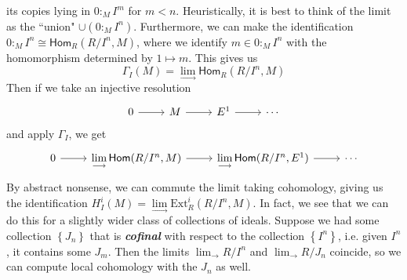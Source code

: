\documentclass[psamsfonts, 12pt]{amsart}
\theoremstyle{definition}
\theoremstyle{remark}
\renewcommand{\hom}{\mathsf{Hom}}
\newcommand{\ib}[1]{\textbf{\textit{#1}}}
\newcommand{\set}[1]{\left\lbrace #1 \right\rbrace}
\begin{document}
its copies lying in $0 :_M I^m$ for $m < n$. Heuristically, it is best to think
of the limit as the ``union" $\cup (0 :_M I^n)$. Furthermore, we can make
the identification $0 :_M I^n \cong \hom_R(R/I^n, M)$, where we identify
$m \in 0:_M I^n$ with the homomorphism determined by $1 \mapsto m$. This gives us
\[
\Gamma_I(M) = \lim_{\longrightarrow}\hom_R(R/I^n,M)
\]
Then if we take an injective resolution
\[\begin{tikzcd}
0 \ar[r] & M \ar[r] & E^1 \ar[r] & \cdots
\end{tikzcd}\]
and apply $\Gamma_I$, we get
\[\begin{tikzcd}
0 \ar[r] & \lim\limits_{\longrightarrow}\hom(R/I^n, M) \ar[r] &
\lim\limits_{\longrightarrow}\hom(R/I^n, E^1) \ar[r] & \cdots
\end{tikzcd}\]
By abstract nonsense, we can commute the limit taking cohomology, giving us the
identification $H^i_I(M) = \lim\limits_{\longrightarrow}\mathrm{Ext}^i_R(R/I^n, M)$.
In fact, we see that we can do this for a slightly wider class of collections
of ideals. Suppose we had some collection $\set{J_n}$ that is \ib{cofinal}
with respect to the collection $\set{I^n}$, i.e. given $I^n$, it contains
some $J_m$. Then the limits $\lim_{\longrightarrow}R/I^n$ and
$\lim_{\longrightarrow}R/J_n$ coincide, so we can compute local cohomology with
the $J_n$ as well. \\
\end{document}
